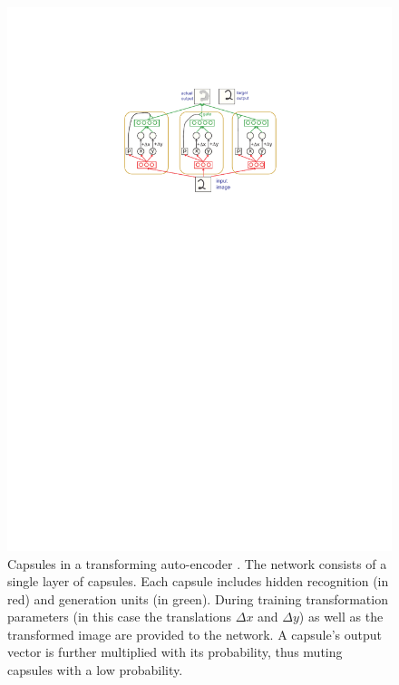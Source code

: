 \begin{figure}
    \centering
    \includegraphics[width=.75\textwidth]{figures/caps-fig1.pdf}
\caption[Capsules in a transforming auto-encoders]{Capsules in a transforming auto-encoder \cite{hinton2011transforming}. The network consists of a single layer of capsules. Each capsule includes hidden recognition (in red) and generation units (in green). During training transformation parameters (in this case the translations $\Delta x$ and $\Delta y$) as well as the transformed image are provided to the network. A capsule's output vector is further multiplied with its probability, thus muting capsules with a low probability.}\label{fig:auto-encoders}
\end{figure}\noindent


